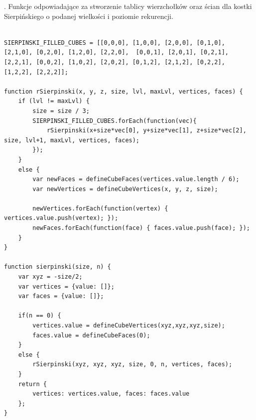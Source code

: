 \documentclass[a4paper,11pt]{article}
\begin{document}
. Funkcje odpowiadające za stworzenie tablicy wierzchołków oraz ścian dla kostki Sierpińskiego o podanej wielkości i poziomie rekurencji.
\begin{verbatim}

SIERPINSKI_FILLED_CUBES = [[0,0,0], [1,0,0], [2,0,0], [0,1,0], [2,1,0], [0,2,0], [1,2,0], [2,2,0],	[0,0,1], [2,0,1], [0,2,1], [2,2,1],	[0,0,2], [1,0,2], [2,0,2], [0,1,2], [2,1,2], [0,2,2], [1,2,2], [2,2,2]];

function rSierpinski(x, y, z, size, lvl, maxLvl, vertices, faces) {
	if (lvl != maxLvl) {
		size = size / 3;		
		SIERPINSKI_FILLED_CUBES.forEach(function(vec){
			rSierpinski(x+size*vec[0], y+size*vec[1], z+size*vec[2], size, lvl+1, maxLvl, vertices, faces);
		});
	}
	else {
		var newFaces = defineCubeFaces(vertices.value.length / 6);
		var newVertices = defineCubeVertices(x, y, z, size);

		newVertices.forEach(function(vertex) { vertices.value.push(vertex); });
		newFaces.forEach(function(face) { faces.value.push(face); });
	}
}

function sierpinski(size, n) {
	var xyz = -size/2;
	var vertices = {value: []};
	var faces = {value: []};

	if(n == 0) {
		vertices.value = defineCubeVertices(xyz,xyz,xyz,size);
		faces.value = defineCubeFaces(0);
	}
	else {
		rSierpinski(xyz, xyz, xyz, size, 0, n, vertices, faces);
	}
	return {
		vertices: vertices.value, faces: faces.value
	};
}
\end{verbatim}
\newpage
\end{document}
